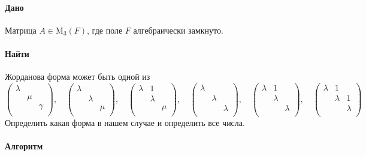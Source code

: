 \documentclass{article}
\newcommand{\Matrix}[2]{\operatorname{\mathrm{M}_{#2}}(#1)}
\begin{document}
\paragraph{Дано}

Матрица $A\in \Matrix{F}{3}$, где поле $F$ алгебраически замкнуто.

\paragraph{Найти}

Жорданова форма может быть одной из
\[
\begin{pmatrix}
{\lambda}&{}&{}\\
{}&{\mu}&{}\\
{}&{}&{\gamma}\\
\end{pmatrix}
,\quad
\begin{pmatrix}
{\lambda}&{}&{}\\
{}&{\lambda}&{}\\
{}&{}&{\mu}\\
\end{pmatrix}
,\quad
\begin{pmatrix}
{\lambda}&{1}&{}\\
{}&{\lambda}&{}\\
{}&{}&{\mu}\\
\end{pmatrix}
,\quad
\begin{pmatrix}
{\lambda}&{}&{}\\
{}&{\lambda}&{}\\
{}&{}&{\lambda}\\
\end{pmatrix}
,\quad
\begin{pmatrix}
{\lambda}&{1}&{}\\
{}&{\lambda}&{}\\
{}&{}&{\lambda}\\
\end{pmatrix}
,\quad
\begin{pmatrix}
{\lambda}&{1}&{}\\
{}&{\lambda}&{1}\\
{}&{}&{\lambda}\\
\end{pmatrix}
\]
Определить какая форма в нашем случае и определить все числа.

\paragraph{Алгоритм}
\end{document}
